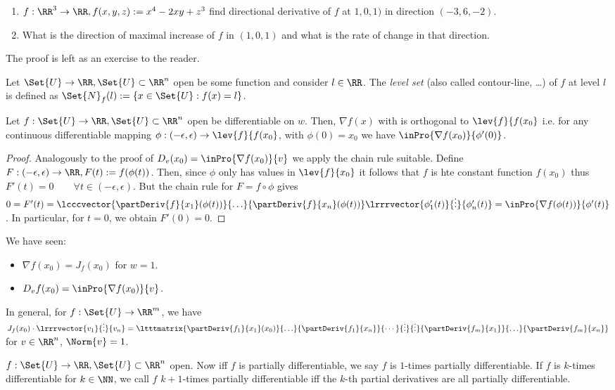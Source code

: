 \begin{exam}
  \begin{enumerate}
  	\item $f:\RR^3\to\RR, f(x,y,z):=x^4-2xy+z^3$ find directional derivative of $f$ at $1,0,1)$ in direction $(-3,6,-2)$. 
  	\item What is the direction of maximal increase of $f$ in $(1,0,1)$ and what is the rate of change in that direction. 
  \end{enumerate}
  The proof is left as an exercise to the reader. 
\end{exam}
\begin{defn}
  Let $\Set{U}\to\RR, \Set{U}\subset\RR^n$ open be some function and consider $l\in\RR$. The \emph{level set} (also called contour-line, \ldots) of $f$ at level $l$ is defined as $\Set{N}_f(l):=\{x\in\Set{U}:f(x)=l\}$. 
\end{defn}
\begin{prop}
  Let $f:\Set{U}\to\RR, \Set{U}\subset\RR^n$ open be differentiable on $w$. Then, $\nabla f(x)$ with  is orthogonal to $\lev{f}{f(x_0}$ i.e. for any continuous differentiable mapping $\phi:(-\epsilon,\epsilon)\to\lev{f}{f(x_0}$, with $\phi(0)=x_0$ we have $\inPro{\nabla f(x_0)}{\phi'(0)}$.
\end{prop}
\begin{proof}
  Analogously to the proof of $D_v(x_0)=\inPro{\nabla f(x_0)}{v}$ we apply the chain rule suitable. Define $F:(-\epsilon, \epsilon)\to\RR, F(t):=f(\phi(t))$. Then, since $\phi$ only has values in $\lev{f}{x_0}$ it follows that $f$ is hte constant function $f(x_0)$ thus $F'(t)=0\qquad\forall t\in(-\epsilon,\epsilon)$. But the chain rule for $F=f\circ \phi$ gives $0=F'(t)=\lcccvector{\partDeriv{f}{x_1}(\phi(t))}{\ldots}{\partDeriv{f}{x_n}(\phi(t))}\lrrrvector{\phi_1'(t)}{\vdots}{\phi_n'(t)}=\inPro{\nabla f(\phi(t))}{\phi'(t)}$. In particular, for $t=0$, we obtain $F'(0)=0$. 
\end{proof}
\begin{rem}
  We have seen: \begin{itemize}
  	\item $\nabla f(x_0)=J_f(x_0)$ for $w=1$. 
  	\item $D_vf(x_0)=\inPro{\nabla f(x_0)}{v}$.
  \end{itemize}
  In general, for $f:\Set{U}\to\RR^m$, we have $J_f(x_0)\cdot \lrrrvector{v_1}{\vdots}{v_n}=\ltttmatrix{\partDeriv{f_1}{x_1}(x_0)}{\ldots}{\partDeriv{f_1}{x_n}}{\cdots}{\vdots}{\vdots}{\partDeriv{f_m}{x_1}}{\ldots}{\partDeriv{f_m}{x_n}}$ for $v\in\RR^n$, $\Norm{v}=1$. 
\end{rem}
\begin{defn}
  $f:\Set{U}\to\RR, \Set{U}\subset\RR^n$ open. 
  Now iff $f$ is partially differentiable, we say $f$ is $1$-times partially differentiable. If $f$ is $k$-times differentiable for $k\in\NN$, we call $f$ $k+1$-times partially differentiable iff the $k$-th partial derivatives are all partially differentiable. 
\end{defn}
